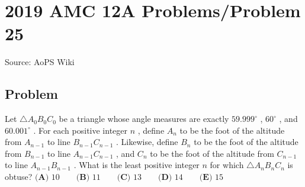 \documentclass[12pt]{article}
\begin{document}
\section*{{2019 AMC 12A Problems/Problem 25}}
Source: AoPS Wiki

\subsection*{Problem}
Let $\triangle A_0B_0C_0$ be a triangle whose angle measures are exactly $59.999^\circ$ , $60^\circ$ , and $60.001^\circ$ . For each positive integer $n$ , define $A_n$ to be the foot of the altitude from $A_{n-1}$ to line $B_{n-1}C_{n-1}$ . Likewise, define $B_n$ to be the foot of the altitude from $B_{n-1}$ to line $A_{n-1}C_{n-1}$ , and $C_n$ to be the foot of the altitude from $C_{n-1}$ to line $A_{n-1}B_{n-1}$ . What is the least positive integer $n$ for which $\triangle A_nB_nC_n$ is obtuse? $\textbf{(A) } 10 \qquad \textbf{(B) }11 \qquad \textbf{(C) } 13\qquad \textbf{(D) } 14 \qquad \textbf{(E) } 15$
\end{document}
